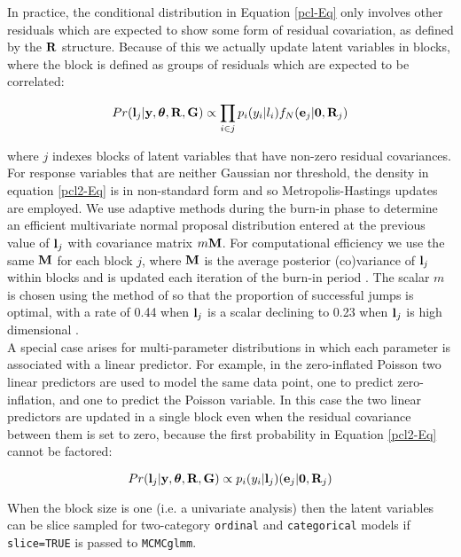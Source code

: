\documentclass{article}
\begin{document}
In practice, the conditional distribution in Equation \ref{pcl-Eq} only involves other residuals which are expected to show some form of residual covariation, as defined by the ${\bf R}$ structure.  Because of this we actually update latent variables in blocks, where the block is defined as groups of residuals which are expected to be correlated:

\begin{equation}
Pr({\bf l}_{j}|{\bf y}, {\bm \theta}, {\bf R}, {\bf G}) \propto   \prod_{i \in j}{p}_{i}({y}_{i} | l_{i})f_{N}({\bf e}_{j}|{\bf 0}, {\bf R}_{j})
\label{pcl2-Eq}
\end{equation}

where $j$ indexes blocks of latent variables that have non-zero residual covariances. For response variables that are neither Gaussian nor threshold, the density in equation \ref{pcl2-Eq} is in non-standard form and so Metropolis-Hastings updates are employed. We use adaptive methods during the burn-in phase to determine an efficient multivariate normal proposal distribution entered at the previous value of ${\bf l}_{j}$ with covariance matrix $m{\bf M}$. For computational efficiency we use the same ${\bf M}$ for each block $j$, where ${\bf M}$ is the average posterior (co)variance of ${\bf l}_{j}$ within blocks and is updated each iteration of the burn-in period  \citet{Haario.2001}. The scalar $m$ is chosen using the method of \citet{Ovaskainen.2008} so that the proportion of successful jumps is optimal, with a rate of 0.44 when ${\bf l}_{j}$ is a scalar declining to 0.23 when ${\bf l}_{j}$ is high dimensional \citep{Gelman.2004}.\\

 A special case arises for multi-parameter distributions in which each parameter is  associated with a linear predictor. For example, in the zero-inflated Poisson two linear predictors are used to model the same data point, one to predict zero-inflation, and one to predict the Poisson variable. In this case the two linear predictors are updated in a single block even when the residual covariance between them is set to zero, because the first probability in Equation \ref{pcl2-Eq} cannot be factored:

\begin{equation}
Pr({\bf l}_{j}|{\bf y}, {\bm \theta}, {\bf R}, {\bf G}) \propto    {p}_{i}({y}_{i} | {\bf l}_{j})({\bf e}_{j}|{\bf 0}, {\bf R}_{j})
\label{pcl3-Eq}
\end{equation}
  
When the block size is one (i.e. a univariate analysis) then the latent variables can be slice sampled for two-category \texttt{ordinal} and \texttt{categorical} models if \texttt{slice=TRUE} is passed to \texttt{MCMCglmm}.\\
\end{document}
